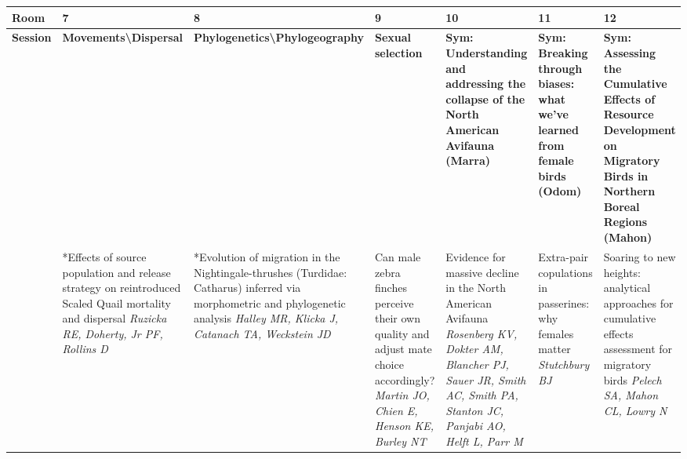 \begin{tabular}{|x{0.75cm}|x{2.25cm}|x{2.25cm}|x{2.25cm}|a{2.25cm}|a{2.25cm}|a{2.25cm}|}\hline
Room & 7 & 8 & 9 & 10 & 11 & 12\\
\hline
\rule{0pt}{1em} \textbf{Session} &\footnotesize \textbf{Movements\textbackslash Dispersal} & \footnotesize \textbf{Phylogenetics\textbackslash Phylogeography} & \footnotesize \textbf{Sexual selection} & \footnotesize \textbf{Sym: Understanding and addressing the collapse of the North American Avifauna (Marra)} & \footnotesize \textbf{Sym: Breaking through biases: what we’ve learned from female birds (Odom)} & \footnotesize \textbf{Sym: Assessing the Cumulative Effects of Resource Development on Migratory Birds in Northern Boreal Regions (Mahon)}\\
\hline
{}&*Effects of source population and release strategy on reintroduced Scaled Quail mortality and dispersal \newline \newline \textit{Ruzicka RE, Doherty, Jr PF, Rollins D} & *Evolution of migration in the Nightingale-thrushes (Turdidae: Catharus) inferred via morphometric and phylogenetic analysis \newline \newline \textit{Halley MR, Klicka J, Catanach TA, Weckstein JD} & Can male zebra finches perceive their own quality and adjust mate choice accordingly? \newline \newline \textit{Martin JO, Chien E, Henson KE, Burley NT} & Evidence for massive decline in the North American Avifauna \newline \newline \textit{Rosenberg KV, Dokter AM, Blancher PJ, Sauer JR, Smith AC, Smith PA, Stanton JC, Panjabi AO, Helft L, Parr M} & Extra-pair copulations in passerines: why females matter \newline \newline \textit{Stutchbury BJ} & Soaring to new heights: analytical approaches for cumulative effects assessment for migratory birds \newline \newline \textit{Pelech SA, Mahon CL, Lowry N}\\
\hline

\end{tabular}
